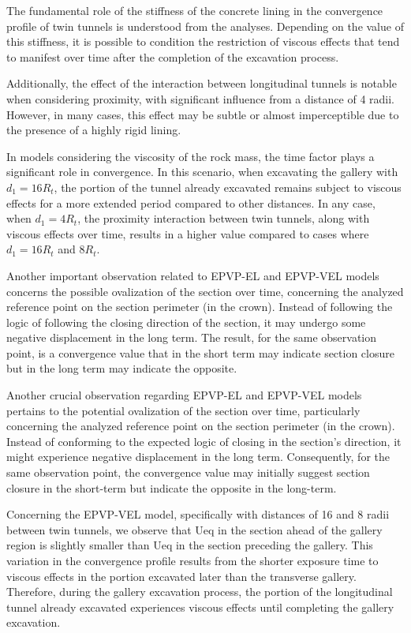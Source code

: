 \documentclass[a4paper,fleqn]{cas-sc}
\begin{document}
The fundamental role of the stiffness of the concrete lining in the convergence profile of twin tunnels is understood from the analyses. Depending on the value of this stiffness, it is possible to condition the restriction of viscous effects that tend to manifest over time after the completion of the excavation process.

Additionally, the effect of the interaction between longitudinal tunnels is notable when considering proximity, with significant influence from a distance of 4 radii. However, in many cases, this effect may be subtle or almost imperceptible due to the presence of a highly rigid lining.

In models considering the viscosity of the rock mass, the time factor plays a significant role in convergence. In this scenario, when excavating the gallery with $d_1 = 16R_t$, the portion of the tunnel already excavated remains subject to viscous effects for a more extended period compared to other distances. In any case, when $d_1 = 4R_t$, the proximity interaction between twin tunnels, along with viscous effects over time, results in a higher value compared to cases where $d_1 = 16R_t$ and $8R_t$.

Another important observation related to EPVP-EL and EPVP-VEL models concerns the possible ovalization of the section over time, concerning the analyzed reference point on the section perimeter (in the crown). Instead of following the logic of following the closing direction of the section, it may undergo some negative displacement in the long term. The result, for the same observation point, is a convergence value that in the short term may indicate section closure but in the long term may indicate the opposite.

Another crucial observation regarding EPVP-EL and EPVP-VEL models pertains to the potential ovalization of the section over time, particularly concerning the analyzed reference point on the section perimeter (in the crown). Instead of conforming to the expected logic of closing in the section's direction, it might experience negative displacement in the long term. Consequently, for the same observation point, the convergence value may initially suggest section closure in the short-term but indicate the opposite in the long-term.

Concerning the EPVP-VEL model, specifically with distances of 16 and 8 radii between twin tunnels, we observe that Ueq in the section ahead of the gallery region is slightly smaller than Ueq in the section preceding the gallery. This variation in the convergence profile results from the shorter exposure time to viscous effects in the portion excavated later than the transverse gallery. Therefore, during the gallery excavation process, the portion of the longitudinal tunnel already excavated experiences viscous effects until completing the gallery excavation. 
\end{document}
